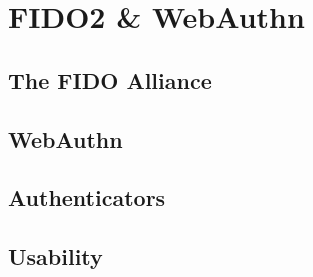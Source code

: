 
\section{FIDO2 \& WebAuthn}
\label{sec:results}


\subsection{The FIDO Alliance}
\label{subsec:fido_alliance}



\subsection{WebAuthn}
\label{subsec:webauthn}



\subsection{Authenticators}
\label{subsec:authenticators}


\subsection{Usability}
\label{subsec:usability}


